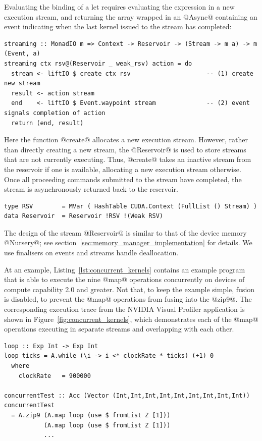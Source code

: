 Evaluating the binding of a let requires evaluating the expression in a new
execution stream, and returning the array wrapped in an @Async@ containing an
event indicating when the last kernel issued to the stream has completed:
%
\begin{lstlisting}[style=haskell]
streaming :: MonadIO m => Context -> Reservoir -> (Stream -> m a) -> m (Event, a)
streaming ctx rsv@(Reservoir _ weak_rsv) action = do
  stream <- liftIO $ create ctx rsv                     -- (1) create new stream
  result <- action stream
  end    <- liftIO $ Event.waypoint stream              -- (2) event signals completion of action
  return (end, result)
\end{lstlisting}
%
Here the function @create@ allocates a new execution stream. However, rather
than directly creating a new stream, the @Reservoir@ is used to store streams
that are not currently executing. Thus, @create@ takes an inactive stream from
the reservoir if one is available, allocating a new execution stream otherwise.
Once all proceeding commands submitted to the stream have completed, the stream
is asynchronously returned back to the reservoir.
%
\begin{lstlisting}[style=haskell]
type RSV        = MVar ( HashTable CUDA.Context (FullList () Stream) )
data Reservoir  = Reservoir !RSV !(Weak RSV)
\end{lstlisting}
%
The design of the stream @Reservoir@ is similar to that of the device memory
@Nursery@; see section~\ref{sec:memory_manager_implementation} for details. We
use finalisers on events and streams handle deallocation.

At an example, Listing~\ref{lst:concurrent_kernels} contains an example program
that is able to execute the nine @map@ operations concurrently on devices of
compute capability 2.0 and greater. Not that, to keep the example simple, fusion
is disabled, to prevent the @map@ operations from fusing into the @zip9@. The
corresponding execution trace from the NVIDIA Visual Profiler application is
shown in Figure~\ref{fig:concurrent_kernels}, which demonstrates each of the
@map@ operations executing in separate streams and overlapping with each other.

\begin{lstlisting}[style=haskell
    ,float
    ,label=lst:concurrent_kernels
    ,caption={[Example program that executes kernels concurrently]
        An example program that executes each of the \code{map} kernels
        concurrently, on devices of compute capability 2.0 and greater. Note
        that in order to keep the example simple, the displayed behaviour is
        only seen when fusion is disabled, to prevent the operations from being
        combined into a singel kernel.}]
loop :: Exp Int -> Exp Int
loop ticks = A.while (\i -> i <* clockRate * ticks) (+1) 0
  where
    clockRate   = 900000

concurrentTest :: Acc (Vector (Int,Int,Int,Int,Int,Int,Int,Int,Int))
concurrentTest
  = A.zip9 (A.map loop (use $ fromList Z [1]))
           (A.map loop (use $ fromList Z [1]))
           ...
\end{lstlisting}

